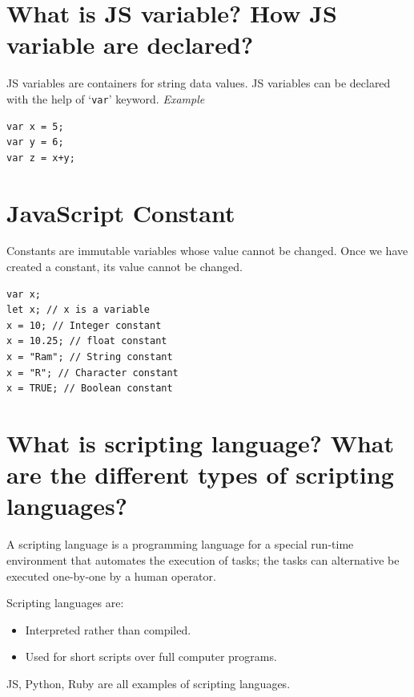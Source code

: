 \documentclass[twocolumn, a4paper]{article}
\begin{document}
\section{What is JS variable? How JS variable are declared?}
JS variables are containers for string data values. JS variables can be
declared with the help of `\verb+var+' keyword.
\vskip10pt \noindent\emph{Example}
\begin{verbatim}
var x = 5;
var y = 6;
var z = x+y;
\end{verbatim}

\section{JavaScript Constant}
Constants are immutable variables whose value cannot be changed. Once we have
created a constant, its value cannot be changed.

\begin{verbatim}
var x;
let x; // x is a variable
x = 10; // Integer constant
x = 10.25; // float constant
x = "Ram"; // String constant
x = "R"; // Character constant
x = TRUE; // Boolean constant
\end{verbatim}

\section{What is scripting language? What are the different types of scripting
languages?}
A scripting language is a programming language for a special run-time
environment that automates the execution of tasks; the tasks can alternative
be executed one-by-one by a human operator.

Scripting languages are:
\begin{itemize}
  \item Interpreted rather than compiled.
  \item Used for short scripts over full computer programs.
\end{itemize}
JS, Python, Ruby are all examples of scripting languages.
\end{document}
